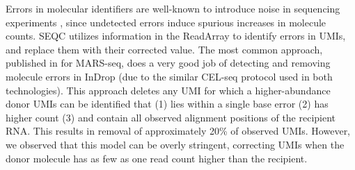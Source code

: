 Errors in molecular identifiers are well-known to introduce noise in sequencing experiments \citep{Jaitin2014}, since undetected errors induce spurious increases in molecule counts. 
SEQC utilizes information in the ReadArray to identify errors in UMIs, and replace them with their corrected value. 
The most common approach, published in \citep{Jaitin2014} for MARS-seq, does a very good job of detecting and removing molecule errors in InDrop (due to the similar CEL-seq protocol used in both technologies). 
This approach deletes any UMI for which a higher-abundance donor UMIs can be identified that (1) lies within a single base error (2) has higher count (3) and contain all observed alignment positions of the recipient RNA\@. 
This results in removal of approximately 20\% of observed UMIs. 
However, we observed that this model can be overly stringent, correcting UMIs when the donor molecule has as few as one read count higher than the recipient. %

